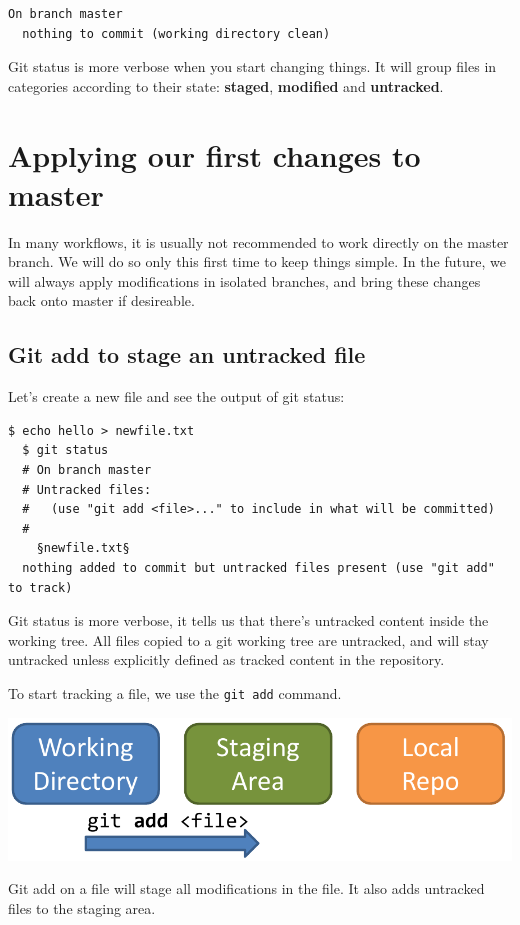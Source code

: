 \documentclass[a4paper]{../../common/tufte-latex/tufte-handout}
\begin{document}
\begin{lstlisting}[style=BashInputStyle]
  On branch master
  nothing to commit (working directory clean)
\end{lstlisting}

Git status is more verbose when you start changing things.
It will group files in categories according to their state: \textbf{staged}, \textbf{modified} and \textbf{untracked}.

\section{Applying our first changes to master}
In many workflows, it is usually not recommended to work directly on the master branch.
We will do so only this first time to keep things simple.
In the future, we will always apply modifications in isolated branches, and bring these changes back onto master if desireable.

\subsection{Git add to stage an untracked file}

Let's create a new file and see the output of git status:

\begin{lstlisting}[style=BashInputStyle]
  $ echo hello > newfile.txt
  $ git status
  # On branch master
  # Untracked files:
  #   (use "git add <file>..." to include in what will be committed)
  #
    §newfile.txt§
  nothing added to commit but untracked files present (use "git add" to track)
\end{lstlisting}

Git status is more verbose, it tells us that there's untracked content inside the working tree.
All files copied to a git working tree are untracked, and will stay untracked unless explicitly defined as tracked content in the repository.

To start tracking a file, we use the \texttt{git add} command.

\begin{marginfigure}%
  \centering
  \includegraphics[width=\linewidth]{gitadd-schema.pdf}
  \label{fig:gitadd}
  \caption{Git add on a file will stage all modifications in the file. It also adds untracked files to the staging area.}
\end{marginfigure}
\end{document}
